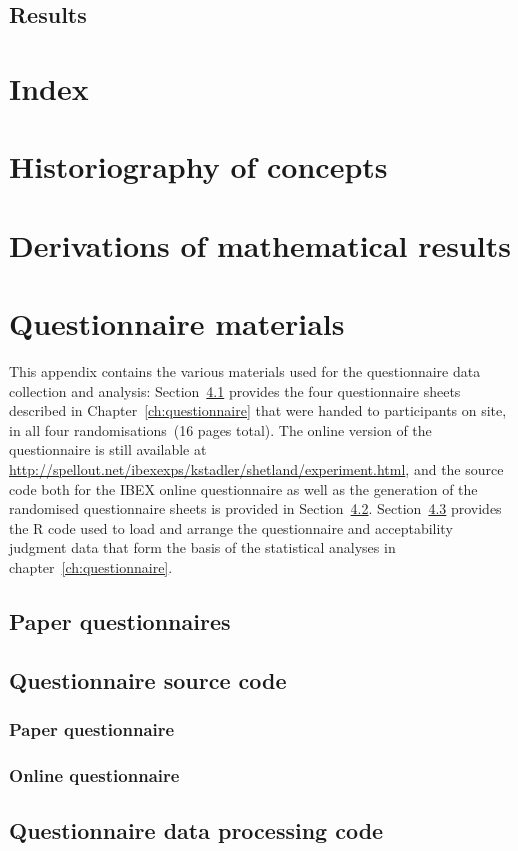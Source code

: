 \documentclass[oneside]{book}
\begin{document}
\section{Results}



%



\chapter*{Index}
\printindex

\appendix
\chapter{Historiography of concepts}
\label{app:concepts}

\chapter{Derivations of mathematical results}
\label{app:math}
%

\chapter{Questionnaire materials}
\label{app:questionnaire}
This appendix contains the various materials used for the questionnaire data collection and analysis: Section~\ref{app:paperquestionnaire} provides the four questionnaire sheets described in Chapter~\ref{ch:questionnaire} that were handed to participants on site, in all four randomisations~(16 pages total). The online version of the questionnaire is still available at \url{http://spellout.net/ibexexps/kstadler/shetland/experiment.html}, and the source code both for the IBEX online questionnaire as well as the generation of the randomised questionnaire sheets is provided in Section~\ref{app:questionnairecode}. Section~\ref{app:questionnairedatacode} provides the R code used to load and arrange the questionnaire and acceptability judgment data that form the basis of the statistical analyses in chapter~\ref{ch:questionnaire}.

\section{Paper questionnaires}
\label{app:paperquestionnaire}
%
%
\section{Questionnaire source code}
\label{app:questionnairecode}
\subsection{Paper questionnaire}
\subsection{Online questionnaire}
\section{Questionnaire data processing code}
\label{app:questionnairedatacode}
\end{document}
